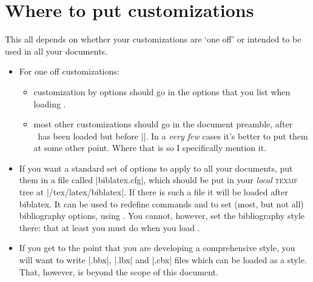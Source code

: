 \section{Where to put customizations}

This all depends on whether your customizations are `one off' or
intended to be used in all your documents.
\begin{itemize}
\item For one off customizations:
\begin{itemize}
\item customization by options should go in the options that you list
  when loading \biblatex.
\item most other customizations should go in the document preamble, after
  \biblatex\ has been loaded but before ||. In a \emph{very
  few} cases it's better to put them at some other point. Where that is so
  I specifically mention it.
\end{itemize}
\item If you want a standard set of options to apply to all your
  documents, put them in a file called |biblatex.cfg|, which should be
  put in your \emph{local} \textsc{texmf} tree at
  |/tex/latex/biblatex|. If there is such a file it will be loaded
  after biblatex. It can be used to redefine commands and to set
  (most, but not all) bibliography options, using
  . You
  cannot, however, set the bibliography style there: that at least you
  must do when you load \biblatex.
\item If you get to the point that you
  are developing a comprehensive style, you will want to write |.bbx|,
  |.lbx| and |.cbx| files which can be loaded as a style. That,
  however, is beyond the scope of this document.
\end{itemize}

